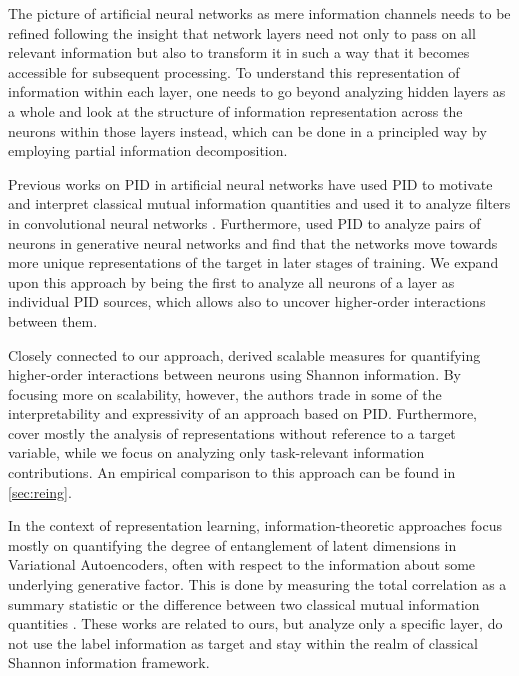 \documentclass[10pt]{article}
\renewcommand\autoref[1]{\cref{#1}}
\theoremstyle{definition}
\theoremstyle{plain}
\begin{document}
The picture of artificial neural networks as mere information channels needs to be refined following the insight that network layers need not only to pass on all relevant information but also to transform it in such a way that it becomes accessible for subsequent processing. To understand this representation of information within each layer, one needs to go beyond analyzing hidden layers as a whole and look at the structure of information representation across the neurons within those layers instead, which can be done in a principled way by employing partial information decomposition.

Previous works on PID in artificial neural networks have used PID to motivate and interpret classical mutual information quantities \citep{wibral2017quantifying} and used it to analyze filters in convolutional neural networks \citep{yu_understanding_2020}. Furthermore, \citet{tax_partial_2017} used PID to analyze pairs of neurons in generative neural networks and find that the networks move towards more unique representations of the target in later stages of training. We expand upon this approach by being the first to analyze all neurons of a layer as individual PID sources, which allows also to uncover higher-order interactions between them.

Closely connected to our approach, \citet{reing_discovering_2021} derived scalable measures for quantifying higher-order interactions between neurons using Shannon information. By focusing more on scalability, however, the authors trade in some of the interpretability and expressivity of an approach based on PID. Furthermore, \citet{reing_discovering_2021} cover mostly the analysis of representations without reference to a target variable, while we focus on analyzing only task-relevant information contributions. An empirical comparison to this approach can be found in \autoref{sec:reing}.

In the context of representation learning, information-theoretic approaches focus mostly on quantifying the degree of entanglement of latent dimensions in Variational Autoencoders, often with respect to the information about some underlying generative factor. This is done by measuring the total correlation \citep{kim_disentangling_2018} as a summary statistic or the difference between two classical mutual information quantities \citep{chen_isolating_2018,tokui_disentanglement_2021}. These works are related to ours, but analyze only a specific layer, do not use the label information as target and stay within the realm of classical Shannon information framework.
\end{document}
